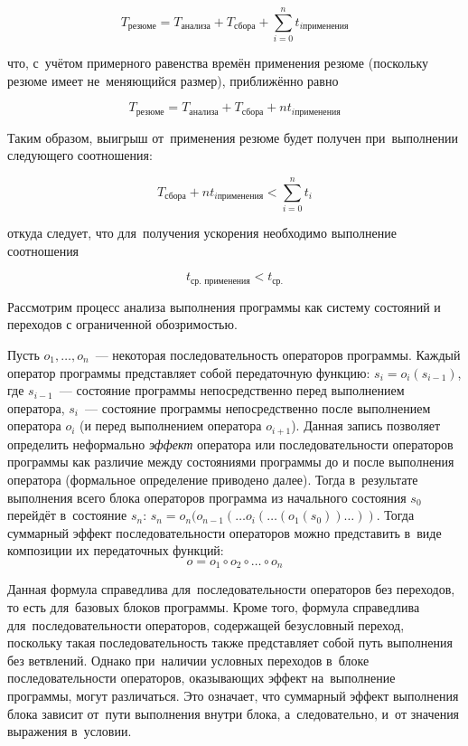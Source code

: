 \begin{equation}
 T_{\text{резюме}} = T_{\text{анализа}} + T_{\text{сбора}} + \sum_{i = 0}^{n} t_{i \text{применения}}
\end{equation}

что, с~учётом примерного равенства времён применения резюме (поскольку резюме имеет не~меняющийся размер), приближённо равно


\begin{equation}
 T_{\text{резюме}} = T_{\text{анализа}} + T_{\text{сбора}} + n t_{i \text{применения}}
\end{equation}

Таким образом, выигрыш от~применения резюме будет получен при~выполнении следующего соотношения:

\begin{equation}
 T_{\text{сбора}} + n t_{i \text{применения}} < \sum_{i = 0}^{n} t_{i}
\end{equation}

откуда следует, что для~получения ускорения необходимо выполнение соотношения

\begin{equation}
 t_{\text{ср. применения}} <  t_{\text{ср.}}
\end{equation}

Рассмотрим процесс анализа выполнения программы как систему состояний и переходов с ограниченной обозримостью.


Пусть $o_1, \ldots, o_n$~--- некоторая последовательность операторов программы. Каждый оператор программы представляет собой передаточную функцию: $s_i = o_i(s_{i-1})$, где $s_{i-1}$~--- состояние программы непосредственно перед выполнением оператора, $s_i$~--- состояние программы непосредственно после выполнением оператора  $o_i$ (и перед выполнением оператора $o_{i+1}$). Данная запись позволяет определить неформально \textit{эффект} оператора или последовательности операторов программы как различие между состояниями программы до и после выполнения оператора (формальное определение приводено далее). Тогда в~результате выполнения всего блока операторов программа из начального состояния $s_0$ перейдёт в~состояние $s_n$: $s_n = o_n(o_{n-1}( \ldots o_i( \ldots (o_1(s_0)) \ldots ))$. Тогда суммарный эффект последовательности операторов можно представить в~виде композиции их передаточных функций:
\begin{equation}
 o = o_1 \circ o_2 \circ \ldots \circ o_n
\end{equation}


Данная формула справедлива для~последовательности операторов без переходов, то есть для~базовых блоков программы. Кроме того, формула справедлива для~последовательности операторов, содержащей безусловный переход, поскольку такая последовательность также представляет собой путь выполнения без ветвлений. Однако при~наличии условных переходов в~блоке последовательности операторов, оказывающих эффект на~выполнение программы, могут различаться. Это означает, что суммарный эффект выполнения блока зависит от~пути выполнения внутри блока, а~следовательно, и~от значения  выражения в~условии.

